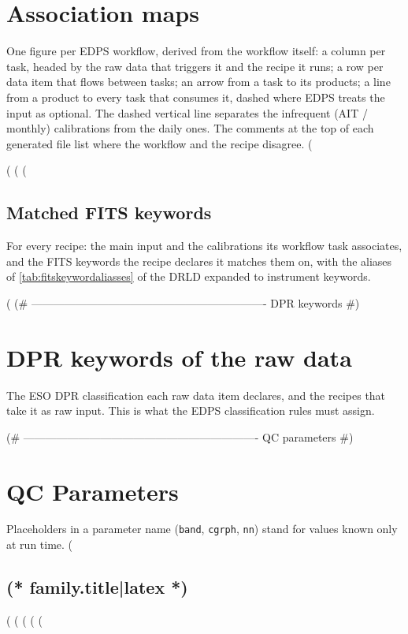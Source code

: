\documentclass[11pt,oneside,a4paper]{article}
\providecommand{\CODE}[1]{\lstinline[]!#1!}
\begin{document}
\section{Association maps}\label{sec:association_maps}
One figure per EDPS workflow, derived from the workflow itself: a column per task, headed by the raw data that
triggers it and the recipe it runs; a row per data item that flows between tasks; an arrow from a task to its
products; a line from a product to every task that consumes it, dashed where EDPS treats the input as optional. The
dashed vertical line separates the infrequent (AIT / monthly) calibrations from the daily ones. The comments at the
top of each generated file list where the workflow and the recipe disagree.
(%
(%
(%
(%
\clearpage
\subsection{Matched FITS keywords}\label{sec:matched_keywords}
For every recipe: the main input and the calibrations its workflow task associates, and the FITS
keywords the recipe declares it matches them on, with the aliases of \autoref{tab:fitskeywordaliasses}
of the DRLD expanded to instrument keywords.

(%
(# ---------------------------------------------------------------- DPR keywords #)
\clearpage
\section{DPR keywords of the raw data}\label{sec:dpr_keywords}
The ESO DPR classification each raw data item declares, and the recipes that take it as raw input.
This is what the EDPS classification rules must assign.

(# ---------------------------------------------------------------- QC parameters #)
\clearpage
\section{QC Parameters}\label{sec:qc_parameters}
Placeholders in a parameter name (\CODE{band}, \CODE{cgrph}, \CODE{nn}) stand for values known only at run time.
(%
\subsection{(* family.title|latex *)}
(%
(%
(%
(%
(%
\end{document}

